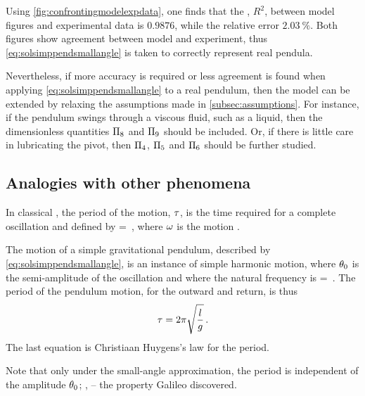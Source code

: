 Using \cref{fig:confrontingmodelexpdata}, one finds that the , $R^2$, between model figures and experimental data is $\num{0.9876}$, while the relative error $\SI{2.03}{\%}$. Both figures show agreement between model and experiment, thus \cref{eq:solsimppendsmallangle} is taken to correctly represent real pendula.

Nevertheless, if more accuracy is required or less agreement is found when applying \cref{eq:solsimppendsmallangle} to a real pendulum, then the model can be extended by relaxing the assumptions made in \cref{subsec:assumptions}. For instance, if the pendulum swings through a viscous fluid, such as a liquid, then the dimensionless quantities $\Pi_8$ and $\Pi_9$ should be included. Or, if there is little care in lubricating the pivot, then $\Pi_4$, $\Pi_5$ and $\Pi_6$ should be further studied.


\subsection{Analogies with other phenomena}\label{subsec:analogieswithotherphenomena}
In classical , the period of the motion, $\tau$, is the time required for a complete oscillation and defined by
\beq
\oscper = \dfrac{2\pi}{\natfreq}\,,
\eeq
where $\omega$ is the motion .

The motion of a simple gravitational pendulum, described by \cref{eq:solsimppendsmallangle}, is an instance of simple harmonic motion, where $\theta_0$ is the semi-amplitude of the oscillation and where the natural frequency is
\beq
\natfreq = \sqrt{\dfrac{\grav}{\length}}\,.
\eeq
The period of the pendulum motion, for the outward and return, is thus
\begin{equation}\label{eq:simplependulumperiod}
\tau = 2\pi\sqrt{\dfrac{l}{g}}\,.
\end{equation}
The last equation is Christiaan Huygens's law for the period.

Note that only under the small-angle approximation, the period is independent of the amplitude $\theta_0$; \ie,  -- the property Galileo discovered.
